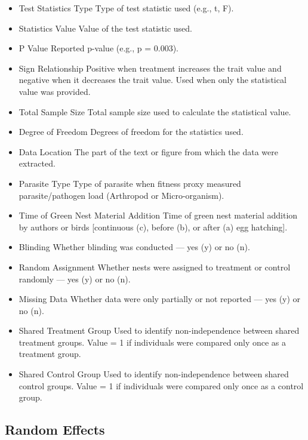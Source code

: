 \documentclass[
  number,
  review,
  onecolumn]{elsarticle}
\begin{document}
\begin{itemize}
  on fitness when primary data were not reported (e.g., t-test, ANOVA).
  Extracted only when central tendency was not reported.
\item
  Test Statistics Type Type of test statistic used (e.g., t, F).
\item
  Statistics Value Value of the test statistic used.
\item
  P Value Reported p-value (e.g., p = 0.003).
\item
  Sign Relationship Positive when treatment increases the trait value
  and negative when it decreases the trait value. Used when only the
  statistical value was provided.
\item
  Total Sample Size Total sample size used to calculate the statistical
  value.
\item
  Degree of Freedom Degrees of freedom for the statistics used.
\item
  Data Location The part of the text or figure from which the data were
  extracted.
\item
  Parasite Type Type of parasite when fitness proxy measured
  parasite/pathogen load (Arthropod or Micro-organism).
\item
  Time of Green Nest Material Addition Time of green nest material
  addition by authors or birds {[}continuous (c), before (b), or after
  (a) egg hatching{]}.
\item
  Blinding Whether blinding was conducted --- yes (y) or no (n).
\item
  Random Assignment Whether nests were assigned to treatment or control
  randomly --- yes (y) or no (n).
\item
  Missing Data Whether data were only partially or not reported --- yes
  (y) or no (n).
\item
  Shared Treatment Group Used to identify non-independence between
  shared treatment groups. Value = 1 if individuals were compared only
  once as a treatment group.
\item
  Shared Control Group Used to identify non-independence between shared
  control groups. Value = 1 if individuals were compared only once as a
  control group.
\end{itemize}

\subsection{Random Effects}\label{random-effects}
\end{document}
